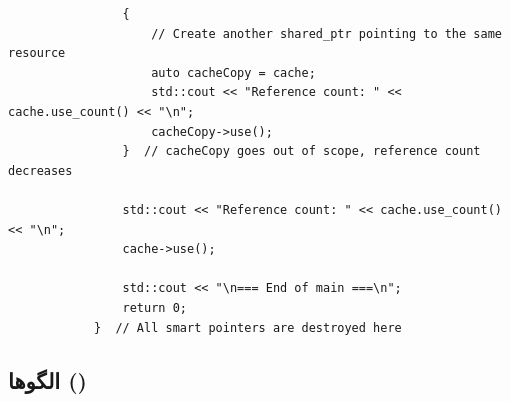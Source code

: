\documentclass{matinbook}
\begin{document}
\begin{latin}
\begin{verbatim}
                {
                    // Create another shared_ptr pointing to the same resource
                    auto cacheCopy = cache;
                    std::cout << "Reference count: " << cache.use_count() << "\n";
                    cacheCopy->use();
                }  // cacheCopy goes out of scope, reference count decreases
                
                std::cout << "Reference count: " << cache.use_count() << "\n";
                cache->use();
                
                std::cout << "\n=== End of main ===\n";
                return 0;
            }  // All smart pointers are destroyed here
        \end{verbatim}
    \end{latin}
    \label{code:smart-pointers}
    
    \subsection{الگوها ()}
    
\end{document}

